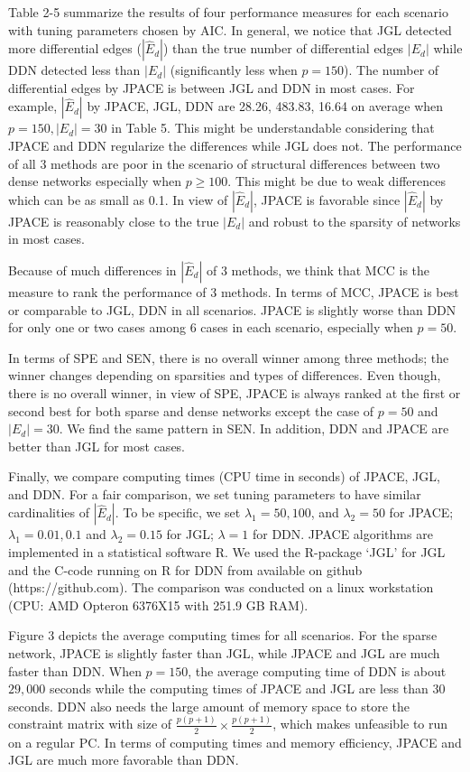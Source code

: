 \documentclass[useAMS,usenatbib,referee]{bio}
\begin{document}
{{Table 2-5 summarize the results of four performance measures for each scenario with tuning parameters chosen by AIC. 
In general, we notice that JGL detected more differential edges ($|\hat{E}_d|$) than the true number of differential edges $|E_d|$ while DDN detected less than $|E_d|$ (significantly less when $p=150$). 
The number of differential edges by JPACE is between JGL and DDN in most cases.
For example, $|\hat{E}_d|$ by JPACE, JGL, DDN are 28.26, 483.83, 16.64 on average when $p=150, |E_d|=30$ in Table 5. 
This might be understandable considering that JPACE and DDN regularize the differences while JGL does not.
The performance of all 3 methods are poor in the scenario of structural differences between two dense networks especially when $p \ge 100$.
This might be due to weak differences which can be as small as 0.1.
In view of $|\hat{E}_d|$, JPACE is favorable since $|\hat{E}_d|$ by JPACE is reasonably close to the true $|E_d|$ and robust to the sparsity of networks in most cases.

Because of much differences in $|\hat{E}_d|$ of 3 methods, we think that MCC is the measure to rank the performance of 3 methods.
In terms of MCC, JPACE is best or comparable to JGL, DDN in all scenarios. JPACE is slightly worse than DDN for only one or two cases among 6 cases in each scenario, especially when $p=50$. 

In terms of SPE and SEN, there is no overall winner among three methods; the winner changes depending on sparsities and types of differences. Even though, there is no overall winner, in view of SPE, JPACE is always ranked at the first or second best for both sparse and dense networks except the case of $p=50$ and $|E_d| = 30$. 
We find the same pattern in SEN. In addition, DDN and JPACE are better than JGL for most cases.
 

Finally, we compare computing times (CPU time in seconds) of JPACE, JGL, and DDN. For a fair comparison, we set tuning parameters to have similar cardinalities of $|\hat{E}_d|$.
To be specific, we set $\lambda_1 = 50, 100$, and $\lambda_2 = 50$ for JPACE; $\lambda_1 = 0.01, 0.1$ and  $\lambda_2 = 0.15$ for JGL; $\lambda = 1$ for DDN.
JPACE algorithms are implemented in a statistical software R.
We used the R-package `JGL' for JGL and the C-code running on R for DDN from \citet{Zhao:2014} available on github (https://github.com).
The comparison was conducted on a linux workstation (CPU: AMD Opteron 6376X15 with 251.9 GB RAM). 

Figure 3 depicts the average computing times for all scenarios.
For the sparse network, JPACE is slightly faster than JGL, while JPACE and JGL are much faster than DDN.
When $p=150$, the average computing time of DDN is about $29,000$ seconds while the computing times of JPACE and JGL are less than $30$ seconds.
DDN also needs the large amount of memory space to store the constraint matrix with size of $\frac{p(p+1)}{2} \times \frac{p(p+1)}{2}$, which makes unfeasible to run on a regular PC.
In terms of computing times and memory efficiency, JPACE and JGL are much more favorable than DDN.

}}
\end{document}
